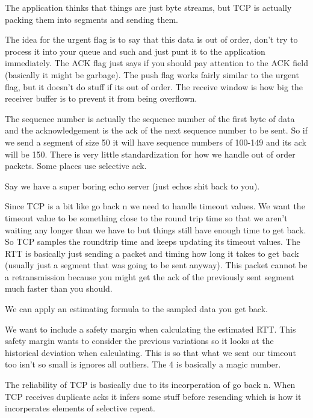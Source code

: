 \documentclass{article}
\begin{document}
The application thinks that things are just byte streams, but TCP is actually packing them into segments and sending them. 


The idea for the urgent flag is to say that this data is out of order, don't try to process it into your queue and such and just punt it to the application immediately. The ACK flag just says if you should pay attention to the ACK field (basically it might be garbage). The push flag works fairly similar to the urgent flag, but it doesn't do stuff if its out of order. The receive window is how big the receiver buffer is to prevent it from being overflown.


The sequence number is actually the sequence number of the first byte of data and the acknowledgement is the ack of the next sequence number to be sent. So if we send a segment of size 50 it will have sequence numbers of 100-149 and its ack will be 150. There is very little standardization for how we handle out of order packets. Some places use selective ack.


Say we have a super boring echo server (just echos shit back to you).


Since TCP is a bit like go back n we need to handle timeout values. We want the timeout value to be something close to the round trip time so that we aren't waiting any longer than we have to but things still have enough time to get back. So TCP samples the roundtrip time and keeps updating its timeout values. The RTT is basically just sending a packet and timing how long it takes to get back (usually just a segment that was going to be sent anyway). This packet cannot be a retransmission because you might get the ack of the previously sent segment much faster than you should.



We can apply an estimating formula to the sampled data you get back.


We want to include a safety margin when calculating the estimated RTT. This safety margin wants to consider the previous variations so it looks at the historical deviation when calculating. This is so that what we sent our timeout too isn't so small is ignores all outliers. The 4 is basically a magic number. 


The reliability of TCP is basically due to its incorperation of go back n. When TCP receives duplicate acks it infers some stuff before resending which is how it incorperates elements of selective repeat.
\end{document}
